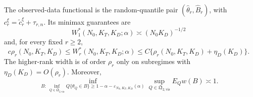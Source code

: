 The observed-data functional is the random-quantile pair \((\widehat\theta_r,\widehat B_r)\), with \(c_r^\xi=\widetilde c_r^\xi+\tau_{r,n}\). Its minimax guarantees are
\[
 W_1^*(N_0,K_T,K_D;\alpha)\asymp(N_0K_D)^{-1/2}
\]
and, for every fixed \(r\ge2\),
\[
 c\rho_r(N_0,K_T,K_D)\le W_r^*(N_0,K_T,K_D;\alpha)
 \le C\{\rho_r(N_0,K_T,K_D)+\eta_D(K_D)\}.
\]
The higher-rank width is of order \(\rho_r\) only on subregimes with \(\eta_D(K_D)=O(\rho_r)\). Moreover,
\[
 \inf_{B:\ \inf_{Q\in\mathfrak Q_{2,\mathrm{vis}}}Q\{\theta_Q\in B\}\ge1-\alpha-\varepsilon_{N_0,K_T,K_D}(\alpha)}
 \sup_{Q\in\mathfrak Q_{2,\mathrm{vis}}}E_Qw(B)\asymp1.
\]